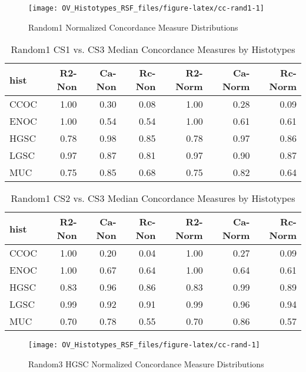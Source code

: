 \documentclass[
]{report}
\begin{document}
\begin{figure}[H]

{\centering \texttt{[image: OV\_Histotypes\_RSF\_files/figure-latex/cc-rand1-1]} 

}

\caption{Random1 Normalized Concordance Measure Distributions}\label{fig:cc-rand1}
\end{figure}

\begin{table}

\caption{\label{tab:rand1-cs1-vs-cs3}Random1 CS1 vs. CS3 Median Concordance Measures by Histotypes}
\centering
\begin{tabular}[t]{l|r|r|r|r|r|r}
\hline
hist & R2-Non & Ca-Non & Rc-Non & R2-Norm & Ca-Norm & Rc-Norm\\
\hline
CCOC & 1.00 & 0.30 & 0.08 & 1.00 & 0.28 & 0.09\\
\hline
ENOC & 1.00 & 0.54 & 0.54 & 1.00 & 0.61 & 0.61\\
\hline
HGSC & 0.78 & 0.98 & 0.85 & 0.78 & 0.97 & 0.86\\
\hline
LGSC & 0.97 & 0.87 & 0.81 & 0.97 & 0.90 & 0.87\\
\hline
MUC & 0.75 & 0.85 & 0.68 & 0.75 & 0.82 & 0.64\\
\hline
\end{tabular}
\end{table}

\begin{table}

\caption{\label{tab:rand1-cs2-vs-cs3}Random1 CS2 vs. CS3 Median Concordance Measures by Histotypes}
\centering
\begin{tabular}[t]{l|r|r|r|r|r|r}
\hline
hist & R2-Non & Ca-Non & Rc-Non & R2-Norm & Ca-Norm & Rc-Norm\\
\hline
CCOC & 1.00 & 0.20 & 0.04 & 1.00 & 0.27 & 0.09\\
\hline
ENOC & 1.00 & 0.67 & 0.64 & 1.00 & 0.64 & 0.61\\
\hline
HGSC & 0.83 & 0.96 & 0.86 & 0.83 & 0.99 & 0.89\\
\hline
LGSC & 0.99 & 0.92 & 0.91 & 0.99 & 0.96 & 0.94\\
\hline
MUC & 0.70 & 0.78 & 0.55 & 0.70 & 0.86 & 0.57\\
\hline
\end{tabular}
\end{table}

\begin{figure}[H]

{\centering \texttt{[image: OV\_Histotypes\_RSF\_files/figure-latex/cc-rand-1]} 

}

\caption{Random3 HGSC Normalized Concordance Measure Distributions}\label{fig:cc-rand}
\end{figure}
\end{document}
